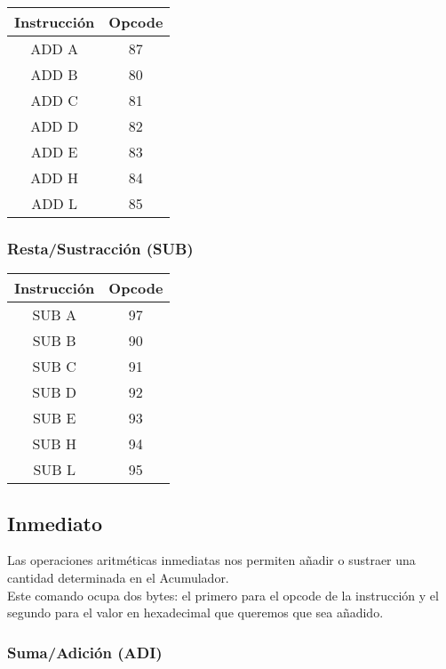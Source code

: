 \documentclass[12pt]{article}
\begin{document}
				\begin{table}[H]
					\centering
					\begin{tabular}{c|c}
						Instrucción & Opcode \\
						\midrule
						ADD A & 87 \\
						ADD B & 80 \\
						ADD C & 81 \\
						ADD D & 82 \\
						ADD E & 83 \\
						ADD H & 84 \\
						ADD L & 85 \\
					\end{tabular}
				\end{table}
				
						
			\subsubsection{Resta/Sustracción (SUB)}
			
				\begin{table}[H]
					\centering
					\begin{tabular}{c|c}
						Instrucción & Opcode \\
						\midrule
						SUB A & 97 \\
						SUB B & 90 \\
						SUB C & 91 \\
						SUB D & 92 \\
						SUB E & 93 \\
						SUB H & 94 \\
						SUB L & 95 \\
					\end{tabular}
				\end{table}
		
		\subsection{Inmediato}
		
			Las operaciones aritméticas inmediatas nos permiten añadir o sustraer una cantidad determinada en el Acumulador.\\
			
			Este comando ocupa dos bytes: el primero para el opcode de la instrucción y el segundo para el valor en hexadecimal que queremos que sea añadido.\\
			
			\subsubsection{Suma/Adición (ADI)}
			
\end{document}
